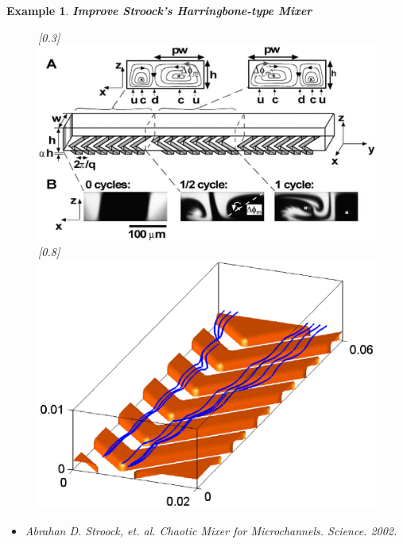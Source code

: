 \documentclass[dvips,landscape]{foils}
\renewcommand{\oursection}[1]{
\foilhead[-1.0cm]{#1}
}
\newtheorem{example}{Example}
\begin{document}
\begin{example}{\bfseries Improve Stroock's Harringbone-type Mixer}
  \begin{figure}
    \centerline{
       \scalebox{0.3}[0.3]{\includegraphics{stroockmixer}}
       \scalebox{0.8}[0.8]{\includegraphics{stroockstructure}}
    }
  \end{figure}
\begin{itemize}\setlength{\parskip}{0pt}  \setlength{\itemsep}{10pt} \setlength{\topsep}{0pt}
\item Abrahan D. Stroock, et. al. Chaotic Mixer for Microchannels. Science. 2002. 
\end{itemize}

\newpage


\end{example}
\end{document}
